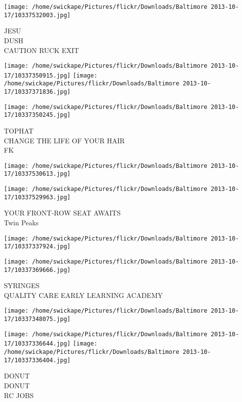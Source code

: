 \documentclass[10pt,letterpaper]{article}
\begin{document}
\vspace{0.25in}
\texttt{[image: /home/swickape/Pictures/flickr/Downloads/Baltimore 2013-10-17/10337532003.jpg]}

JESU\\
DUSH\\
CAUTION RUCK EXIT
\pagebreak

\texttt{[image: /home/swickape/Pictures/flickr/Downloads/Baltimore 2013-10-17/10337350915.jpg]}
\texttt{[image: /home/swickape/Pictures/flickr/Downloads/Baltimore 2013-10-17/10337371836.jpg]}

\texttt{[image: /home/swickape/Pictures/flickr/Downloads/Baltimore 2013-10-17/10337350245.jpg]}

TOPHAT\\
CHANGE THE LIFE OF YOUR HAIR\\
FK
\pagebreak

\texttt{[image: /home/swickape/Pictures/flickr/Downloads/Baltimore 2013-10-17/10337530613.jpg]}

\vspace{0.25in}
\texttt{[image: /home/swickape/Pictures/flickr/Downloads/Baltimore 2013-10-17/10337529963.jpg]}

YOUR FRONT{-}ROW SEAT AWAITS\\
Twin Peaks
\pagebreak

\texttt{[image: /home/swickape/Pictures/flickr/Downloads/Baltimore 2013-10-17/10337337924.jpg]}

\vspace{0.25in}
\texttt{[image: /home/swickape/Pictures/flickr/Downloads/Baltimore 2013-10-17/10337369666.jpg]}

SYRINGES\\
QUALITY CARE EARLY LEARNING ACADEMY
\pagebreak

\texttt{[image: /home/swickape/Pictures/flickr/Downloads/Baltimore 2013-10-17/10337348075.jpg]}

\vspace{0.25in}
\texttt{[image: /home/swickape/Pictures/flickr/Downloads/Baltimore 2013-10-17/10337336644.jpg]}
\texttt{[image: /home/swickape/Pictures/flickr/Downloads/Baltimore 2013-10-17/10337336404.jpg]}

DONUT\\
DONUT\\
RC JOBS
\pagebreak
\end{document}
